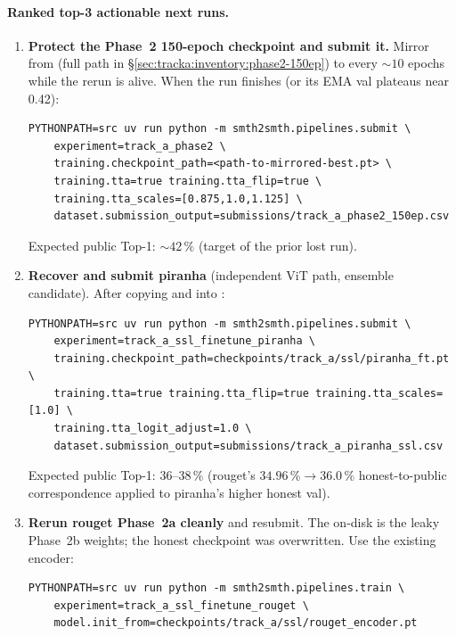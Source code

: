\paragraph{Ranked top-3 actionable next runs.}

\begin{enumerate}[leftmargin=*]
\item \textbf{Protect the Phase~2 150-epoch checkpoint and submit it.}
   Mirror  from
    (full path in
   \S\ref{sec:tracka:inventory:phase2-150ep}) to
    every \(\sim 10\) epochs while
   the rerun is alive.  When the run
   finishes (or its EMA val plateaus near 0.42):
\begin{lstlisting}[style=shell]
PYTHONPATH=src uv run python -m smth2smth.pipelines.submit \
    experiment=track_a_phase2 \
    training.checkpoint_path=<path-to-mirrored-best.pt> \
    training.tta=true training.tta_flip=true \
    training.tta_scales=[0.875,1.0,1.125] \
    dataset.submission_output=submissions/track_a_phase2_150ep.csv
\end{lstlisting}
   Expected public Top-1: \(\sim 42\,\%\) (target of the prior lost
   run).
\item \textbf{Recover and submit piranha} (independent ViT path,
   ensemble candidate).  After copying \file{piranha\_encoder.pt} and
    into :
\begin{lstlisting}[style=shell]
PYTHONPATH=src uv run python -m smth2smth.pipelines.submit \
    experiment=track_a_ssl_finetune_piranha \
    training.checkpoint_path=checkpoints/track_a/ssl/piranha_ft.pt \
    training.tta=true training.tta_flip=true training.tta_scales=[1.0] \
    training.tta_logit_adjust=1.0 \
    dataset.submission_output=submissions/track_a_piranha_ssl.csv
\end{lstlisting}
   Expected public Top-1: 36--38\,\% (rouget's
   \(34.96\,\% \to 36.0\,\%\) honest-to-public correspondence applied to
   piranha's higher honest val).
\item \textbf{Rerun rouget Phase~2a cleanly} and resubmit.  The on-disk
   \file{rouget\_ft.pt} is the leaky Phase~2b weights; the honest checkpoint
   was overwritten.  Use the existing encoder:
\begin{lstlisting}[style=shell]
PYTHONPATH=src uv run python -m smth2smth.pipelines.train \
    experiment=track_a_ssl_finetune_rouget \
    model.init_from=checkpoints/track_a/ssl/rouget_encoder.pt

\end{lstlisting}
\end{enumerate}

